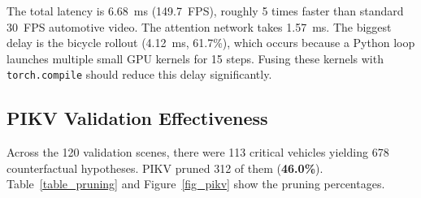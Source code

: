 \documentclass[preprint,12pt]{elsarticle}
\begin{document}
The total latency is 6.68~ms (149.7~FPS), roughly 5 times faster than standard 30~FPS automotive video. The attention network takes 1.57~ms. The biggest delay is the bicycle rollout (4.12~ms, 61.7\%), which occurs because a Python loop launches multiple small GPU kernels for 15 steps. Fusing these kernels with \texttt{torch.compile} should reduce this delay significantly.

\subsection{PIKV Validation Effectiveness}
Across the 120 validation scenes, there were 113 critical vehicles yielding 678 counterfactual hypotheses. PIKV pruned 312 of them (\textbf{46.0\%}). Table~\ref{table_pruning} and Figure~\ref{fig_pikv} show the pruning percentages.

\begin{table}[H]
\caption{PIKV hypothesis pruning across the six counterfactual modes (678 hypotheses, 113 per mode, from real traffic validation samples).}
\label{table_pruning}
\centering
{}
\end{table}
\end{document}
